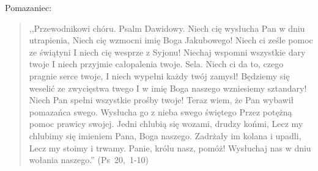 \documentclass[10pt,a4paper,oneside]{article}
\begin{document}
Pomazaniec:
\begin{quote}
,,Przewodnikowi chóru. Psalm Dawidowy. Niech cię wysłucha Pan w dniu utrapienia, Niech cię wzmocni imię Boga Jakubowego! Niech ci ześle pomoc ze świątyni I niech cię wesprze z Syjonu! Niechaj wspomni wszystkie dary twoje I niech przyjmie całopalenia twoje. Sela. Niech ci da to, czego pragnie serce twoje, I niech wypełni każdy twój zamysł! Będziemy się weselić ze zwycięstwa twego I w imię Boga naszego wzniesiemy sztandary! Niech Pan spełni wszystkie prośby twoje! Teraz wiem, że Pan wybawił pomazańca swego. Wysłucha go z nieba swego świętego Przez potężną pomoc prawicy swojej. Jedni chlubią się wozami, drudzy końmi, Lecz my chlubimy się imieniem Pana, Boga naszego. Zadrżały im kolana i upadli, Lecz my stoimy i trwamy. Panie, królu nasz, pomóż! Wysłuchaj nas w dniu wołania naszego.'' \mbox{(Ps 20, 1-10)}
\end{quote}
\end{document}
